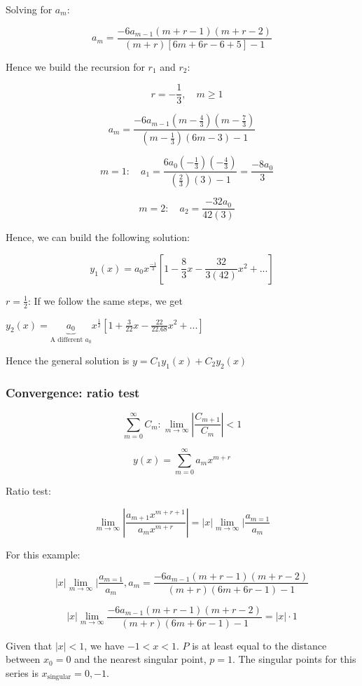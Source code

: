 \documentclass{article}
\begin{document}
Solving for $a_m$:

$$a_m = \frac{-6 a_{m-1} (m+r-1)(m+r-2)}{(m+r) \left[6m+6r-6+5 \right] - 1}$$

Hence we build the recursion for $r_1$ and $r_2$:

$$\quad r = - \frac{1}{3}, \quad m \geq 1$$

$$a_m = \frac{-6 a_{m-1} \left( m - \frac{4}{3} \right) \left( m - \frac{7}{3} \right)}{\left(m - \frac{1}{3} \right) \left( 6m-3 \right) - 1}$$

$$\quad m = 1: \quad a_1 = \frac{6 a_0 \left(- \frac{1}{3} \right) \left( - \frac{4}{3} \right)}{\left( \frac{2}{3} \right) (3) - 1}  = \frac{-8 a_0}{3}$$

$$\quad m = 2: \quad a_2 = \frac{-32 a_0}{42(3)}$$

Hence, we can build the following solution:

$$y_1(x) = a_0 x^{\frac{-1}{3}} \left[ 1- \frac{8}{3} x - \frac{32}{3(42)} x^2 + ... \right]$$

$r = \frac{1}{2}$: If we follow the same steps, we get 

$y_2(x) = \underbrace{a_0}_{\text{A different } a_0} x^{\frac{1}{2}} \left[ 1 + \frac{3}{22} x - \frac{22}{22.68}x^2 + ... \right]$

Hence the general solution is $y = C_1 y_1 (x) + C_2 y_2 (x)$

\subsubsection{Convergence: ratio test}

$$\sum_{m = 0}^\infty C_m: \lim_{m \to \infty} | \frac{C_{m+1}}{C_m} | < 1$$

$$y(x) = \sum_{m = 0}^\infty a_m x^{m+r}$$

Ratio test:

$$\lim_{m \to \infty} | \frac{a_{m+1} x^{m+r+1}}{a_m x^{m+r}} | = |x| \lim_{m \to \infty} | \frac{a_{m=1}}{a_m}$$

For this example:

$$ |x| \lim_{m \to \infty} | \frac{a_{m=1}}{a_m}, a_m = \frac{-6 a_{m-1} (m+r-1) (m+r-2)}{(m+r) (6m + 6r - 1) - 1}$$

$$ |x| \lim_{m \to \infty}  \frac{-6 a_{m-1} (m+r-1) (m+r-2)}{(m+r) (6m + 6r - 1) - 1} = |x| \cdot 1$$


Given that $|x| < 1$, we have $-1 < x < 1$. $P$ is at least equal to the distance between $x_0 = 0$ and the nearest singular point, $p =1$. The singular points for this series is $x_{\text{singular}} = 0, -1$. 
\end{document}
